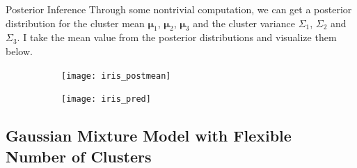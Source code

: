 \documentclass{beamer}
\begin{document}
	\begin{frame}{Posterior Inference}
		Through some nontrivial computation, we can get a posterior distribution for the cluster mean $\bm{\mu}_1$, $\bm{\mu}_2$, $\bm{\mu}_3$ and the cluster variance $\Sigma_1$, $\Sigma_2$ and $\Sigma_3$. I take the mean value from the posterior distributions and visualize them below.
		\begin{figure}[htbp]
		\begin{subfigure}[b]{0.48\columnwidth}
			\centering
			\texttt{[image: iris\_postmean]}
		\end{subfigure}
		\hfill
		\begin{subfigure}[b]{0.48\columnwidth}
			\centering
			\texttt{[image: iris\_pred]}
		\end{subfigure}
			\end{figure}
		
	\end{frame}


	\subsection{Gaussian Mixture Model with Flexible Number of Clusters}
		\begin{frame}
		\tableofcontents
		[
		currentsection,
		currentsubsection,
		subsectionstyle=show/shaded/hide
		]
	\end{frame}
\end{document}
